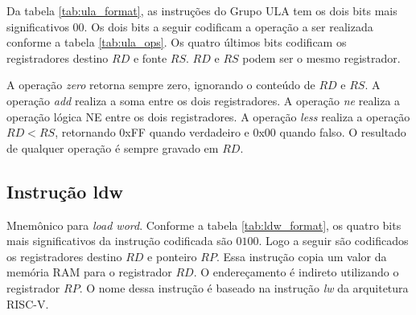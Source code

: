 \documentclass[a4paper, 12pt]{article}
\begin{document}
\begin{table}[ht]
	\centering
	\caption{Codificação das operações}
	\label{tab:ula_ops}
\end{table}

\par
Da tabela \ref{tab:ula_format}, as instruções do Grupo ULA tem os dois bits mais significativos $00$.
Os dois bits a seguir codificam a operação a ser realizada conforme a tabela \ref{tab:ula_ops}.
Os quatro últimos bits codificam os registradores destino $RD$ e fonte $RS$. $RD$ e $RS$ podem ser
o mesmo registrador.
\par
A operação \textit{zero} retorna sempre zero, ignorando o conteúdo de $RD$ e $RS$.
A operação \textit{add} realiza a soma entre os dois registradores.
A operação \textit{ne} realiza a operação lógica NE entre os dois registradores.
A operação \textit{less} realiza a operação $RD < RS$, retornando 0xFF quando verdadeiro e 0x00 quando falso.
O resultado de qualquer operação é sempre gravado em $RD$.


\subsection{Instrução ldw}

\begin{table}[ht]
	\centering
	\caption{Formato da instrução codificada \textit{ldw}}
	\label{tab:ldw_format}
\end{table}
\par

Mnemônico para \textit{load word}. Conforme a tabela \ref{tab:ldw_format}, os 
quatro bits mais significativos da instrução codificada são $0100$.
Logo a seguir são codificados os registradores destino $RD$ e ponteiro $RP$.
Essa instrução copia um valor da memória RAM para o registrador $RD$.
O endereçamento é indireto utilizando o registrador $RP$.
O nome dessa instrução é baseado na instrução \textit{lw} da arquitetura RISC-V.
\end{document}

